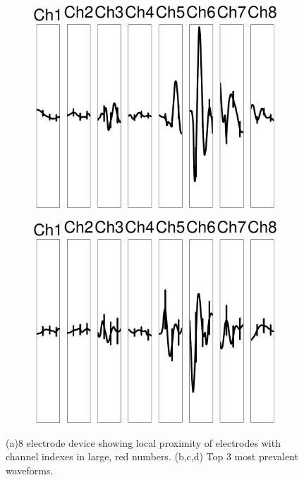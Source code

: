 \begin{center}
\begin{figure}
\begin{subfigure}[b]{.24\textwidth}
\includegraphics[width=\textwidth]{../figs/8devim/clus9}
\caption{}
\label{ex82}
\end{subfigure}
\begin{subfigure}[b]{.24\textwidth}
\includegraphics[width=\textwidth]{../figs/8devim/clus6}
\caption{}
\label{ex83}
\end{subfigure}
\caption{(a)8 electrode device showing local proximity of electrodes with channel indexes in large, red numbers. (b,c,d) Top 3 most prevalent waveforms.}
\end{figure}
\end{center}
